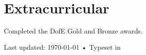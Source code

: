 \documentclass[10pt, a4paper]{article}
\begin{document}
\section*{Extracurricular}

Completed the DofE Gold and Bronze awards.

\vfill{}

\begin{center}
  {
    \scriptsize  Last updated: \today\- •\- 
    Typeset in \href{http://nitens.org/taraborelli/cvtex}{
      \XeTeX }\\ 
  }
\end{center}
\end{document}

